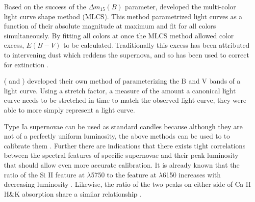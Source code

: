 Based on the success of the $\Delta m_{15} (B)$ parameter, \citet{Riess96b} developed the multi-color light curve shape method (MLCS). This method parametrized light curves as a function of their absolute magnitude at maximum and fit for all colors simultaneously. By fitting all colors at once the MLCS method allowed color excess, $E(B-V)$ to be calculated. Traditionally this excess has been attributed to intervening dust which reddens the supernova, and so has been used to correct for extinction \citep{riess96c}. %

\citeauthor{perlmutter99a} (\citeyear{perlmutter97a} and \citeyear{perlmutter99a}) developed their own method of parameterizing the B and V bands of a light curve. Using a stretch factor, a measure of the amount a canonical light curve needs to be stretched in time to match the observed light curve, they were able to more simply represent a light curve.

Type Ia supernovae can be used as standard candles because although they are not of a perfectly uniform luminosity, the above methods can be used to to calibrate them \citep{perlmutter03a}. Further there are indications that there exists tight correlations between the spectral features of specific supernovae and their peak luminosity that should allow even more accurate calibration. It is already known that the ratio of the Si II feature at $\lambda$5750 to the feature at $\lambda$6150 increases with decreasing luminosity \citep{nugent95a}. Likewise, the ratio of the two peaks on either side of Ca II H\&K absorption share a similar relationship \citep{filippenko97a}.
